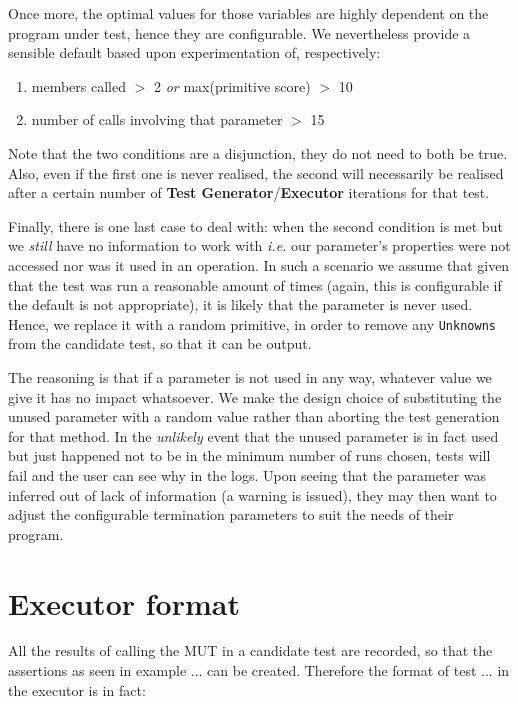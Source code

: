 Once more, the optimal values for those variables are highly dependent on the program under test, hence they are configurable. We nevertheless provide a sensible default based upon experimentation of, respectively:

\begin{enumerate}
   \item members called \(>\) 2 \emph{or} max(primitive score) \(>\) 10
   \item number of calls involving that parameter \(>\) 15
\end{enumerate}

Note that the two conditions are a disjunction, they do not need to both be true. Also, even if the first one is never realised, the second will necessarily be realised after a certain number of \textbf{Test Generator}/\textbf{Executor} iterations for that test.

Finally, there is one last case to deal with: when the second condition is met but we \emph{still} have no information to work with \emph{i.e.} our parameter's properties were not accessed nor was it used in an operation. In such a scenario we assume that given that the test was run a reasonable amount of times (again, this is configurable if the default is not appropriate), it is likely that the parameter is never used. Hence, we replace it with a random primitive, in order to remove any \texttt{Unknowns} from the candidate test, so that it can be output.

The reasoning is that if a parameter is not used in any way, whatever value we give it has no impact whatsoever. We make the design choice of substituting the unused parameter with a random value rather than aborting the test generation for that method. In the \emph{unlikely} event that the unused parameter is in fact used but just happened not to be in the minimum number of runs chosen, tests will fail and the user can see why in the logs. Upon seeing that the parameter was inferred out of lack of information (a warning is issued), they may then want to adjust the configurable termination parameters to suit the needs of their program.

\section{Executor format}

All the results of calling the MUT in a candidate test are recorded, so that the assertions as seen in example ... can be created. Therefore the format of test ... in the executor is in fact:

